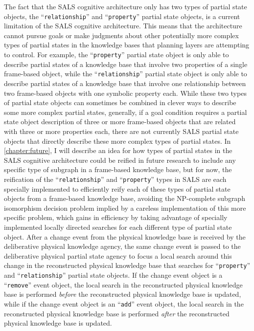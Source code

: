 The fact that the SALS cognitive architecture only has two types of
partial state objects, the ``{\tt{relationship}}'' and
``{\tt{property}}'' partial state objects, is a current limitation of
the SALS cognitive architecture.  This means that the architecture
cannot pursue goals or make judgments about other potentially more
complex types of partial states in the knowledge bases that planning
layers are attempting to control.  For example, the
``{\tt{property}}'' partial state object is only able to describe
partial states of a knowledge base that involve two properties of a
single frame-based object, while the ``{\tt{relationship}}'' partial
state object is only able to describe partial states of a knowledge
base that involve one relationship between two frame-based objects
with one symbolic property each.  While these two types of partial
state objects can sometimes be combined in clever ways to describe
some more complex partial states, generally, if a goal condition
requires a partial state object description of three or more
frame-based objects that are related with three or more properties
each, there are not currently SALS partial state objects that directly
describe these more complex types of partial states.  In
{\mbox{\autoref{chapter:future}}}, I will describe an idea for how
types of partial states in the SALS cognitive architecture could be
reified in future research to include any specific type of subgraph in
a frame-based knowledge base, but for now, the reification of the
``{\tt{relationship}}'' and ``{\tt{property}}'' types in SALS are each
specially implemented to efficiently reify each of these types of
partial state objects from a frame-based knowledge base, avoiding the
NP-complete subgraph isomorphism decision problem
\cite[]{messmer:1995,messmer:2000} implied by a careless
implementation of this more specific problem, which gains in
efficiency by taking advantage of specially implemented locally
directed searches for each different type of partial state object.
After a change event from the physical knowledge base is received by
the deliberative physical knowledge agency, the same change event is
passed to the deliberative physical partial state agency to focus a
local search around this change in the reconstructed physical
knowledge base that searches for ``{\tt{property}}'' and
``{\tt{relationship}}'' partial state objects.  If the change event
object is a ``{\tt{remove}}'' event object, the local search in the
reconstructed physical knowledge base is performed \emph{before} the
reconstructed physical knowledge base is updated, while if the change
event object is an ``{\tt{add}}'' event object, the local search in
the reconstructed physical knowledge base is performed \emph{after}
the reconstructed physical knowledge base is updated.

